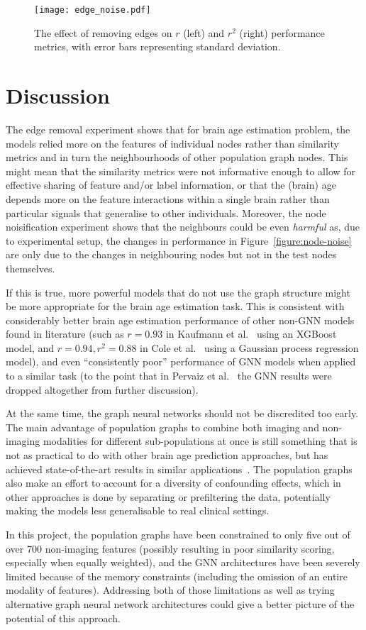 \begin{figure}[h]
    \centering
    \texttt{[image: edge\_noise.pdf]}
    \caption{The effect of removing edges on $r$ (left) and $r^2$ (right) performance metrics, with error bars representing standard deviation.}\label{figure:edge-noise}
\end{figure}


\section{Discussion}
 The edge removal experiment shows that for brain age estimation problem, the models relied more on the features of individual nodes rather than similarity metrics and in turn the neighbourhoods of other population graph nodes. This might mean that the similarity metrics were not informative enough to allow for effective sharing of feature and/or label information, or that the (brain) age depends more on the feature interactions within a single brain rather than particular signals that generalise to other individuals. Moreover, the node noisification experiment shows that the neighbours could be even \textit{harmful} as, due to experimental setup, the changes in performance in Figure~\ref{figure:node-noise} are only due to the changes in neighbouring nodes but not in the test nodes themselves.

If this is true, more powerful models that do not use the graph structure might be more appropriate for the brain age estimation task. This is consistent with considerably better brain age estimation performance of other non-GNN models found in literature (such as $r=0.93$ in Kaufmann et al.~\cite{kaufmann2019} using an XGBoost model, and $r=0.94, r^2=0.88$ in Cole et al.~\cite{cole2018brain} using a Gaussian process regression model), and even ``consistently poor'' performance of GNN models when applied to a similar task (to the point that in Pervaiz et al.~\cite{pervaiz2020optimising} the GNN results were dropped altogether from further discussion).

At the same time, the graph neural networks should not be discredited too early. The main advantage of population graphs to combine both imaging and non-imaging modalities for different sub-populations at once is still something that is not as practical to do with other brain age prediction approaches, but has achieved state-of-the-art results in similar applications~\cite{parisot2018disease}. The population graphs also make an effort to account for a diversity of confounding effects, which in other approaches is done by separating or prefiltering the data, potentially making the models less generalisable to real clinical settings.

In this project, the population graphs have been constrained to only five out of over 700 non-imaging features (possibly resulting in poor similarity scoring, especially when equally weighted), and the GNN architectures have been severely limited because of the memory constraints (including the omission of an entire modality of features). Addressing both of those limitations as well as trying alternative graph neural network architectures could give a better picture of the potential of this approach.
